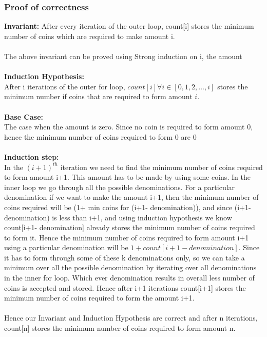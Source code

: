 \documentclass{article}
\begin{document}
\subsubsection{Proof of correctness}
\textbf{Invariant:} After every iteration of the outer loop, count[i] stores the minimum number of coins which are required to make amount i.
\\\\
The above invariant can be proved using Strong induction on i, the amount
\\\\
\textbf{Induction Hypothesis:}\\
After i iterations of the outer for loop, ${count[i] \forall i\in[0,1,2,\dots,i]}$ stores the minimum number if coins that are required to form amount $i$.
\\\\
\textbf{Base Case:}\\
The case when the amount is zero. Since no coin is required to form amount 0, hence the minimum number of coins required to form 0  are 0 
\\\\
\textbf{Induction step:}\\
In the $(i+1)^{th}$ iteration we need to find the minimum number of coins required to form amount i+1. This amount has to be made by using some coins. In the inner loop we go through all the possible denominations. For a particular denomination if we want to make the amount i+1, then the minimum number of coins required will be (1+ min coins for (i+1- denomination)), and since (i+1-denomination) is less than i+1, and using induction hypothesis we know count[i+1- denomination] already stores the minimum number of coins required to form it. Hence the minimum number of coins required to form amount i+1 using a particular denomination will be $1+count[i+1-denomination]$. Since it has to form through some of these k denominations only, so we can take a minimum over all the possible denomination by iterating over all denominations in the inner for loop. Which ever denomination results in overall less number of coins is accepted and stored. Hence after i+1 iterations count[i+1] stores the minimum number of coins required to form the amount i+1.
\\\\
Hence our Invariant and Induction Hypothesis are correct and after n iterations, count[n] stores the minimum number of coins required to form amount n.
\end{document}
